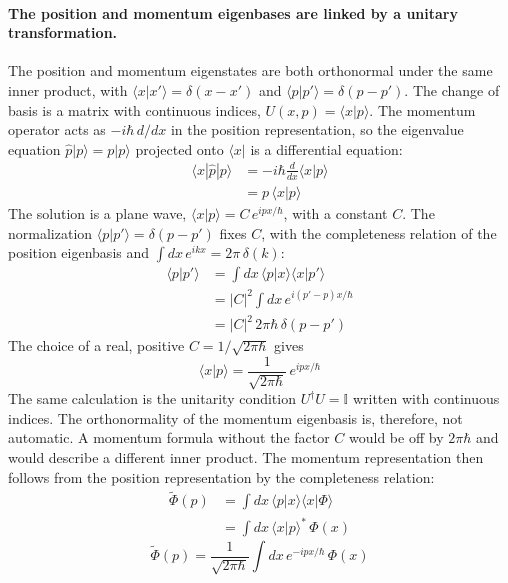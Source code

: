 \paragraph{The position and momentum eigenbases are linked by a unitary transformation.} The position and momentum eigenstates are both orthonormal under the same inner product, with $\langle x | x' \rangle = \delta(x - x')$ and $\langle p | p' \rangle = \delta(p - p')$. The change of basis is a matrix with continuous indices, $U(x, p) = \langle x | p \rangle$. The momentum operator acts as $-i\hbar\, d/dx$ in the position representation, so the eigenvalue equation $\hat p |p\rangle = p |p\rangle$ projected onto $\langle x|$ is a differential equation:
\begin{align*}
    \langle x | \hat p | p \rangle &= -i\hbar \frac{d}{dx} \langle x | p \rangle \\
    &= p\, \langle x | p \rangle
\end{align*}
The solution is a plane wave, $\langle x | p \rangle = C\, e^{ipx/\hbar}$, with a constant $C$. The normalization $\langle p | p' \rangle = \delta(p - p')$ fixes $C$, with the completeness relation of the position eigenbasis and $\int dx\, e^{ikx} = 2\pi\, \delta(k)$:
\begin{align*}
    \langle p | p' \rangle &= \int dx\, \langle p | x \rangle \langle x | p' \rangle \\
    &= |C|^2 \int dx\, e^{i(p' - p)x/\hbar} \\
    &= |C|^2\, 2\pi\hbar\, \delta(p - p')
\end{align*}
The choice of a real, positive $C = 1/\sqrt{2\pi\hbar}$ gives
\begin{equation}
    \boxed{\langle x | p \rangle = \frac{1}{\sqrt{2\pi\hbar}}\, e^{ipx/\hbar}}
\end{equation}
The same calculation is the unitarity condition $U^{\dagger} U = \mathbb{I}$ written with continuous indices. The orthonormality of the momentum eigenbasis is, therefore, not automatic. A momentum formula without the factor $C$ would be off by $2\pi\hbar$ and would describe a different inner product. The momentum representation then follows from the position representation by the completeness relation:
\begin{align*}
    \tilde{\Phi}(p) &= \int dx\, \langle p | x \rangle \langle x | \Phi \rangle \\
    &= \int dx\, \langle x | p \rangle^{*}\, \Phi(x)
\end{align*}
\begin{equation}
    \boxed{\tilde{\Phi}(p) = \frac{1}{\sqrt{2\pi\hbar}} \int dx\, e^{-ipx/\hbar}\, \Phi(x)}
\end{equation}
